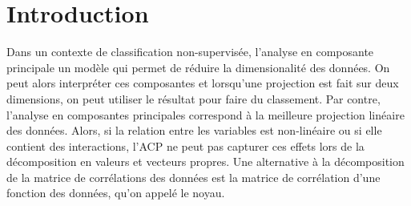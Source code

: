 \section{Introduction}

Dans un contexte de classification non-supervisée, l'analyse en composante principale un modèle qui permet de réduire la dimensionalité des données. On peut alors interpréter ces composantes et lorsqu'une projection est fait sur deux dimensions, on peut utiliser le résultat pour faire du classement. Par contre, l'analyse en composantes principales correspond à la meilleure projection linéaire des données. Alors, si la relation entre les variables est non-linéaire ou si elle contient des interactions, l'ACP ne peut pas capturer ces effets lors de la décomposition en valeurs et vecteurs propres. Une alternative à la décomposition de la matrice de corrélations des données est la matrice de corrélation d'une fonction des données, qu'on appelé le noyau. 

